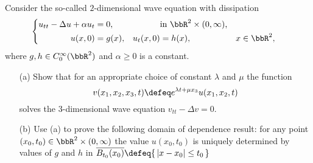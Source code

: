 \begin{problem}
  Consider the so-called \(2\)-dimensional wave equation with dissipation
  \[
    \left\{
      \begin{aligned}
        u_{tt}-\Delta u+\alpha u_t&=0,&&\text{in \(\bbR^2\times(0,\infty)\),}\\
        u(x,0)&=g(x),&u_t(x,0)&=h(x),&&x\in\bbR^2,
      \end{aligned}
    \right.
  \]
  where \(g,h\in C_0^\infty(\bbR^2)\) and \(\alpha\geq 0\) is a constant.
  \begin{itemize}[noitemsep]
  \item[(a)] Show that for an appropriate choice of constant \(\lambda\)
    and \(\mu\) the function
    \[
      v(x_1,x_2,x_3,t)\defeq e^{\lambda t+\mu x_3}u(x_1,x_2,t)
    \]
    solves the \(3\)-dimensional wave equation \(v_{tt}-\Delta v=0\).
  \item[(b)] Use (a) to prove the following domain of dependence result:
    for any point \((x_0,t_0)\in\bbR^2\times(0,\infty)\) the value
    \(u(x_0,t_0)\) is uniquely determined by values of \(g\) and \(h\) in
    \(\overline{B_{t_0}(x_0)}\defeq\{\,|x-x_0|\leq t_0\,\}\)
  \end{itemize}
\end{problem}
\begin{solution}
\end{solution}

\begin{problem}
\end{problem}
\begin{solution}
\end{solution}

